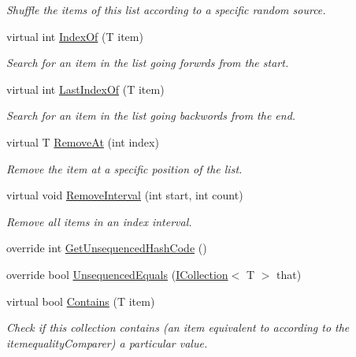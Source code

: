 \begin{DoxyCompactItemize}
\begin{DoxyCompactList}\small\item\em Shuffle the items of this list according to a specific random source. \end{DoxyCompactList}\item 
virtual int \hyperlink{class_c5_1_1_array_list_ae94dff251b125331c450b396418bb1be}{Index\+Of} (T item)
\begin{DoxyCompactList}\small\item\em Search for an item in the list going forwrds from the start. \end{DoxyCompactList}\item 
virtual int \hyperlink{class_c5_1_1_array_list_af04d77e11483bfcfa1cac7fd88b57bc5}{Last\+Index\+Of} (T item)
\begin{DoxyCompactList}\small\item\em Search for an item in the list going backwords from the end. \end{DoxyCompactList}\item 
virtual T \hyperlink{class_c5_1_1_array_list_a0f3b4828a1c3ba06d035ad6f2aa491fc}{Remove\+At} (int index)
\begin{DoxyCompactList}\small\item\em Remove the item at a specific position of the list. \end{DoxyCompactList}\item 
virtual void \hyperlink{class_c5_1_1_array_list_aa4c6f08712ec985076e402d713e5a616}{Remove\+Interval} (int start, int count)
\begin{DoxyCompactList}\small\item\em Remove all items in an index interval. \end{DoxyCompactList}\item 
override int \hyperlink{class_c5_1_1_array_list_a4f75d053012574e34e670597aa392e6f}{Get\+Unsequenced\+Hash\+Code} ()
\item 
override bool \hyperlink{class_c5_1_1_array_list_a46753a14629243761d6056839747f23f}{Unsequenced\+Equals} (\hyperlink{interface_c5_1_1_i_collection}{I\+Collection}$<$ T $>$ that)
\item 
virtual bool \hyperlink{class_c5_1_1_array_list_a481c1d9104e4c5fbd4dd79be7a1e5c38}{Contains} (T item)
\begin{DoxyCompactList}\small\item\em Check if this collection contains (an item equivalent to according to the itemequality\+Comparer) a particular value. \end{DoxyCompactList}\item 

\end{DoxyCompactItemize}
